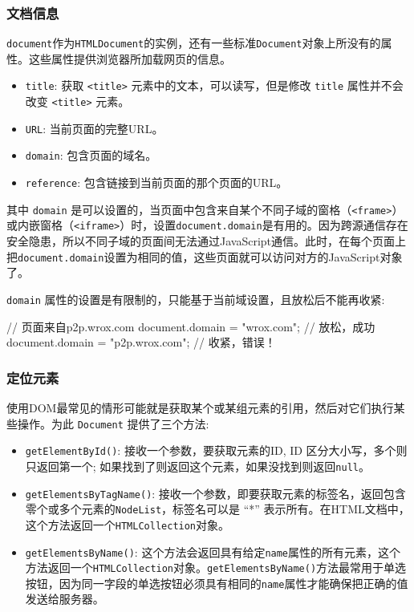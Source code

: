 \subsubsection*{文档信息}

\texttt{document}作为\texttt{HTMLDocument}的实例，还有一些标准\texttt{Document}对象上所没有的属性。这些属性提供浏览器所加载网页的信息。

\begin{itemize}
    \item \texttt{title}: 获取 \texttt{<title>} 元素中的文本，可以读写，但是修改 \texttt{title} 属性并不会改变 \texttt{<title>} 元素。
    \item \texttt{URL}: 当前页面的完整URL。
    \item \texttt{domain}: 包含页面的域名。
    \item \texttt{reference}: 包含链接到当前页面的那个页面的URL。
\end{itemize}

其中 \texttt{domain} 是可以设置的，当页面中包含来自某个不同子域的窗格（\texttt{<frame>}）或内嵌窗格（\texttt{<iframe>}）时，设置\texttt{document.domain}是有用的。因为跨源通信存在安全隐患，所以不同子域的页面间无法通过JavaScript通信。此时，在每个页面上把\texttt{document.domain}设置为相同的值，这些页面就可以访问对方的JavaScript对象了。

\texttt{domain} 属性的设置是有限制的，只能基于当前域设置，且放松后不能再收紧:

\begin{JavaScript}
// 页面来自p2p.wrox.com 
document.domain = "wrox.com";     // 放松，成功
document.domain = "p2p.wrox.com"; // 收紧，错误！
\end{JavaScript}

\subsubsection*{定位元素}

使用DOM最常见的情形可能就是获取某个或某组元素的引用，然后对它们执行某些操作。为此 \texttt{Document} 提供了三个方法:
\begin{itemize}
    \item \texttt{getElementById()}:  接收一个参数，要获取元素的ID, ID 区分大小写，多个则只返回第一个; 如果找到了则返回这个元素，如果没找到则返回\texttt{null}。
    \item \texttt{getElementsByTagName()}: 接收一个参数，即要获取元素的标签名，返回包含零个或多个元素的\texttt{NodeList}，标签名可以是 ``*'' 表示所有。在HTML文档中，这个方法返回一个\texttt{HTMLCollection}对象。
    \item \texttt{getElementsByName()}: 这个方法会返回具有给定\texttt{name}属性的所有元素，这个方法返回一个\texttt{HTMLCollection}对象。\texttt{getElementsByName()}方法最常用于单选按钮，因为同一字段的单选按钮必须具有相同的\texttt{name}属性才能确保把正确的值发送给服务器。
\end{itemize}

